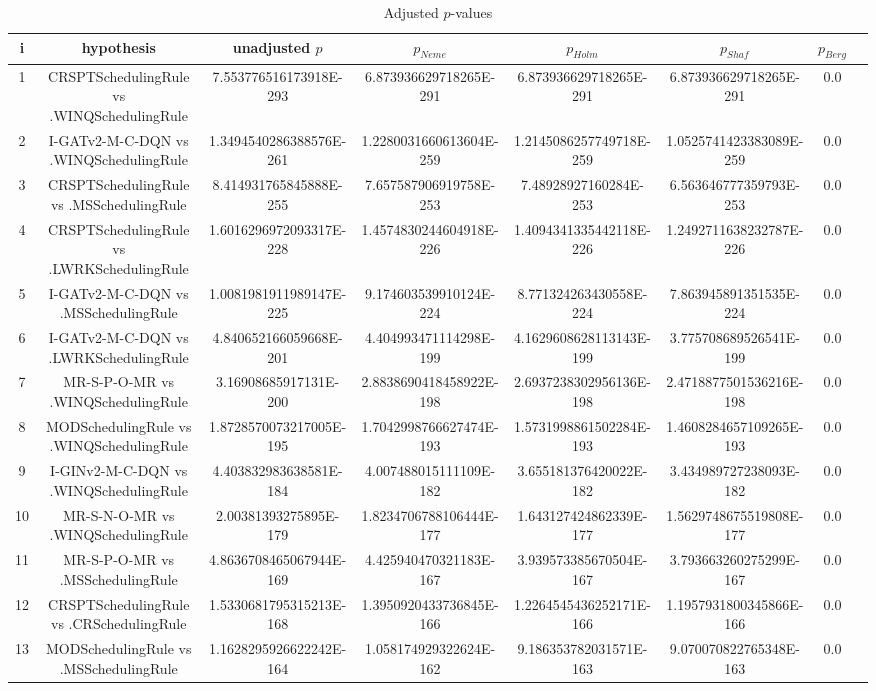 \documentclass[a3paper,10pt]{article}
\begin{document}
\begin{table}[!htp]
\centering\tiny
\caption{Adjusted $p$-values}
\begin{tabular}{cccccccc}
i&hypothesis&unadjusted $p$&$p_{Neme}$&$p_{Holm}$&$p_{Shaf}$&$p_{Berg}$\\
\hline
1&CRSPTSchedulingRule vs .WINQSchedulingRule&7.553776516173918E-293&6.873936629718265E-291&6.873936629718265E-291&6.873936629718265E-291&0.0\\
2&I-GATv2-M-C-DQN vs .WINQSchedulingRule&1.3494540286388576E-261&1.2280031660613604E-259&1.2145086257749718E-259&1.0525741423383089E-259&0.0\\
3&CRSPTSchedulingRule vs .MSSchedulingRule&8.414931765845888E-255&7.657587906919758E-253&7.48928927160284E-253&6.563646777359793E-253&0.0\\
4&CRSPTSchedulingRule vs .LWRKSchedulingRule&1.6016296972093317E-228&1.4574830244604918E-226&1.4094341335442118E-226&1.2492711638232787E-226&0.0\\
5&I-GATv2-M-C-DQN vs .MSSchedulingRule&1.0081981911989147E-225&9.174603539910124E-224&8.771324263430558E-224&7.863945891351535E-224&0.0\\
6&I-GATv2-M-C-DQN vs .LWRKSchedulingRule&4.840652166059668E-201&4.404993471114298E-199&4.1629608628113143E-199&3.775708689526541E-199&0.0\\
7&MR-S-P-O-MR vs .WINQSchedulingRule&3.16908685917131E-200&2.8838690418458922E-198&2.6937238302956136E-198&2.4718877501536216E-198&0.0\\
8&MODSchedulingRule vs .WINQSchedulingRule&1.8728570073217005E-195&1.7042998766627474E-193&1.5731998861502284E-193&1.4608284657109265E-193&0.0\\
9&I-GINv2-M-C-DQN vs .WINQSchedulingRule&4.403832983638581E-184&4.007488015111109E-182&3.655181376420022E-182&3.434989727238093E-182&0.0\\
10&MR-S-N-O-MR vs .WINQSchedulingRule&2.00381393275895E-179&1.8234706788106444E-177&1.643127424862339E-177&1.5629748675519808E-177&0.0\\
11&MR-S-P-O-MR vs .MSSchedulingRule&4.8636708465067944E-169&4.425940470321183E-167&3.939573385670504E-167&3.793663260275299E-167&0.0\\
12&CRSPTSchedulingRule vs .CRSchedulingRule&1.5330681795315213E-168&1.3950920433736845E-166&1.2264545436252171E-166&1.1957931800345866E-166&0.0\\
13&MODSchedulingRule vs .MSSchedulingRule&1.1628295926622242E-164&1.058174929322624E-162&9.186353782031571E-163&9.070070822765348E-163&0.0\\

\end{tabular}
\end{table}
\end{document}
